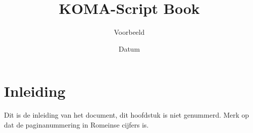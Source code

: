 \documentclass[
    fontsize=10pt,
    twoside=semi,
    usegeometry,
    autoenlargeheadfoot=false,
    toc=bibliography,
    open=any,
]{scrbook}
\title{KOMA-Script Book}
\subtitle{Voorbeeld}
\date{Datum}
\begin{document}
    \frontmatter

    \maketitle
    \tableofcontents
    \chapter{Inleiding}
    Dit is de inleiding van het document, dit hoofdstuk is niet genummerd.
    Merk op dat de paginanummering in Romeinse cijfers is.

    \mainmatter
    

    \backmatter
    \printbibliography
\end{document}
